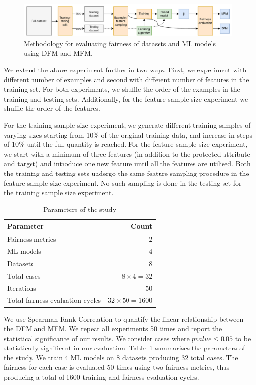 \documentclass[sigconf,review,anonymous]{acmart}
\begin{document}
\begin{figure}
  \centering
  \includegraphics[width=\linewidth]{method.pdf}
  \caption{Methodology for evaluating fairness of datasets and ML
  models using DFM and MFM.}
  \label{fig:method}
\end{figure}

We extend the above experiment further in two ways. First, we
experiment with different number of examples and second with different
number of features in the training set. For both experiments, we
shuffle the order of the examples in the training and testing
sets. Additionally, for the feature sample size experiment we shuffle
the order of the features.

For the training sample size experiment, we generate different
training samples of varying sizes starting from 10\% of the original
training data, and increase in steps of 10\% until the full quantity
is reached. For the feature sample size experiment, we start with
a minimum of three features (in addition to the protected attribute
and target) and introduce one new feature until all the features are
utilised. Both the training and testing sets undergo the same feature
sampling procedure in the feature sample size experiment. No such
sampling is done in the testing set for the training sample size
experiment.

\begin{table}
  \centering
  \begin{tabular}{l r}
    \toprule
    \textbf{Parameter} & \textbf{Count}\\
    \midrule
    Fairness metrics & $2$\\
    ML models & $4$\\
    Datasets & $8$\\
    Total cases & $8\times4=32$\\
    Iterations & $50$\\
    Total fairness evaluation cycles & $32\times50=1600$\\
    \bottomrule
  \end{tabular}
  \caption{Parameters of the study}
  \label{tab:parameters}
\end{table}

We use Spearman Rank Correlation to quantify the linear relationship
between the DFM and MFM. We repeat all experiments 50 times and report
the statistical significance of our results. We consider cases where
$pvalue\le0.05$ to be statistically significant in our
evaluation. Table \ref{tab:parameters} summarises the parameters of
the study. We train 4 ML models on 8 datasets producing 32 total
cases. The fairness for each case is evaluated 50 times using two
fairness metrics, thus producing a total of 1600 training and fairness
evaluation cycles.
\end{document}
